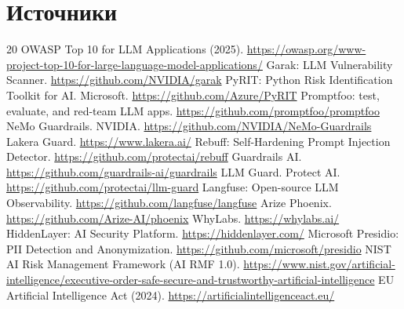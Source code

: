 \documentclass[12pt,a4paper]{article}
\begin{document}
\section*{Источники}

\begin{thebibliography}{20}
   OWASP Top 10 for LLM Applications (2025). \url{https://owasp.org/www-project-top-10-for-large-language-model-applications/}
   Garak: LLM Vulnerability Scanner. \url{https://github.com/NVIDIA/garak}
   PyRIT: Python Risk Identification Toolkit for AI. Microsoft. \url{https://github.com/Azure/PyRIT}
   Promptfoo: test, evaluate, and red-team LLM apps. \url{https://github.com/promptfoo/promptfoo}
   NeMo Guardrails. NVIDIA. \url{https://github.com/NVIDIA/NeMo-Guardrails}
   Lakera Guard. \url{https://www.lakera.ai/}
   Rebuff: Self-Hardening Prompt Injection Detector. \url{https://github.com/protectai/rebuff}
   Guardrails AI. \url{https://github.com/guardrails-ai/guardrails}
   LLM Guard. Protect AI. \url{https://github.com/protectai/llm-guard}
   Langfuse: Open-source LLM Observability. \url{https://github.com/langfuse/langfuse}
   Arize Phoenix. \url{https://github.com/Arize-AI/phoenix}
   WhyLabs. \url{https://whylabs.ai/}
   HiddenLayer: AI Security Platform. \url{https://hiddenlayer.com/}
   Microsoft Presidio: PII Detection and Anonymization. \url{https://github.com/microsoft/presidio}
   NIST AI Risk Management Framework (AI RMF 1.0). \url{https://www.nist.gov/artificial-intelligence/executive-order-safe-secure-and-trustworthy-artificial-intelligence}
   EU Artificial Intelligence Act (2024). \url{https://artificialintelligenceact.eu/}
\end{thebibliography}
\end{document}
